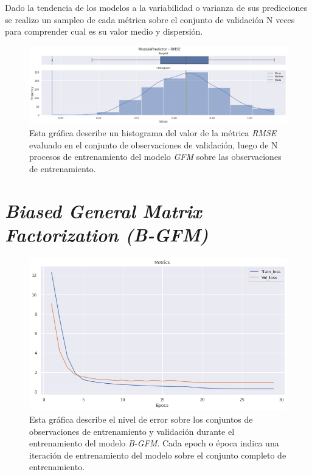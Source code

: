 \documentclass[11pt,a4paper,twoside]{thesis}
\begin{document}
{Dado la tendencia de los modelos a la variabilidad o varianza de sus predicciones se realizo un sampleo de cada métrica sobre el conjunto de validación N veces para comprender cual es su valor medio y dispersión.

\begin{figure}[h!]
	\centering
	\includegraphics[width=15cm]{./images/metrics-GFM-RMSE.png}
	\caption{Esta gráfica describe un histograma del valor de la métrica \textit{RMSE} evaluado en el conjunto de observaciones de validación, luego de N procesos de entrenamiento del modelo \textit{GFM} sobre las observaciones de entrenamiento.}
\end{figure}



\clearpage
\section{\textit{Biased General Matrix Factorization (B-GFM)}}

\begin{figure}[h!]
	\centering
	\includegraphics[width=13cm]{./images/metrics-BGFM-train-val-loss.png}
	\caption{Esta gráfica describe el nivel de error sobre los conjuntos de observaciones de entrenamiento y validación durante el entrenamiento del modelo \textit{B-GFM}. Cada epoch o época indica una iteración de entrenamiento del modelo sobre el conjunto completo de entrenamiento.}
\end{figure}

}
\end{document}
